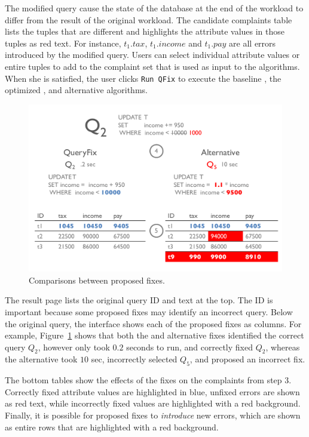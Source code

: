 The modified query cause the state of the database at the end of the workload
to differ from the result of the original workload.  The candidate complaints table lists the tuples
that are different and highlights the attribute values in those tuples as red text.  For instance,
$t_1.tax$, $t_1.income$ and $t_1.pay$ are all errors introduced by the modified query. 
Users can select individual attribute values or entire tuples to add to the complaint set that is used as input to the \sys algorithms.  
When she is satisfied, the user clicks \texttt{Run QFix} to execute the baseline \sys, the optimized \sys, and alternative algorithms.


\begin{figure}[t]
\centering
  \includegraphics[width = .9\columnwidth]{figures/demo2_exp2}
  \vspace*{-0.2in}
  \caption{Comparisons between proposed fixes.}
  \label{f:demo2} 
  \vspace*{-.2in}
\end{figure}

  The result page lists the original query ID and text at the top.  The ID 
is important because some proposed fixes may identify an incorrect query.  Below the original query,
the interface shows each of the proposed fixes as columns.  For example, Figure~\ref{f:demo2} shows 
that both the \sys and alternative fixes identified the correct query $Q_2$, however \sys only took $0.2$ seconds
to run, and correctly fixed $Q_2$, whereas the alternative took $10$ sec, 
incorrectly selected $Q_5$, and proposed an incorrect fix.

 The bottom tables show the effects of the fixes on the complaints from
step 3.  Correctly fixed attribute values are highlighted in blue, unfixed errors are shown as red text, while incorrectly
fixed values are highlighted with a red background.  Finally, it is possible for proposed fixes to 
{\it introduce} new errors, which are shown as entire rows that are highlighted with a red background.







